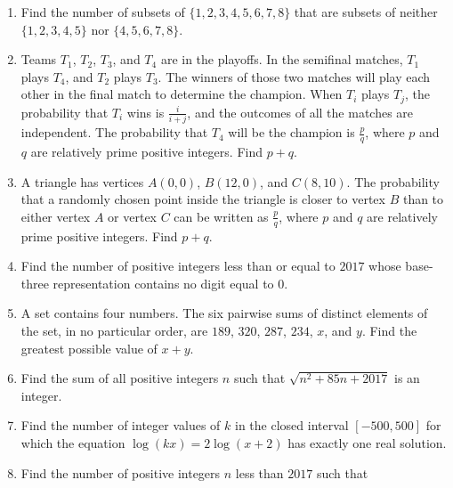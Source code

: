\documentclass{article}
\begin{document}
\begin{enumerate}[label=\arabic*., itemsep=0.5em]
\item Find the number of subsets of \(\{1, 2, 3, 4, 5, 6, 7, 8\}\) that are subsets of neither \(\{1, 2, 3, 4, 5\}\) nor \(\{4, 5, 6, 7, 8\}\).\par \vspace{0.5em}\item Teams \(T_1\), \(T_2\), \(T_3\), and \(T_4\) are in the playoffs. In the semifinal matches, \(T_1\) plays \(T_4\), and \(T_2\) plays \(T_3\). The winners of those two matches will play each other in the final match to determine the champion. When \(T_i\) plays \(T_j\), the probability that \(T_i\) wins is \(\frac{i}{i+j}\), and the outcomes of all the matches are independent. The probability that \(T_4\) will be the champion is \(\frac{p}{q}\), where \(p\) and \(q\) are relatively prime positive integers. Find \(p+q\).\par \vspace{0.5em}\item A triangle has vertices \(A(0,0)\), \(B(12,0)\), and \(C(8,10)\). The probability that a randomly chosen point inside the triangle is closer to vertex \(B\) than to either vertex \(A\) or vertex \(C\) can be written as \(\frac{p}{q}\), where \(p\) and \(q\) are relatively prime positive integers. Find \(p+q\).\par \vspace{0.5em}\item Find the number of positive integers less than or equal to \(2017\) whose base-three representation contains no digit equal to \(0\).\par \vspace{0.5em}\item A set contains four numbers. The six pairwise sums of distinct elements of the set, in no particular order, are \(189\), \(320\), \(287\), \(234\), \(x\), and \(y\). Find the greatest possible value of \(x+y\).\par \vspace{0.5em}\item Find the sum of all positive integers \(n\) such that \(\sqrt{n^2+85n+2017}\) is an integer.\par \vspace{0.5em}\item Find the number of integer values of \(k\) in the closed interval \([-500,500]\) for which the equation \(\log(kx)=2\log(x+2)\) has exactly one real solution.\par \vspace{0.5em}\item Find the number of positive integers \(n\) less than \(2017\) such that 

\end{enumerate}
\end{document}
